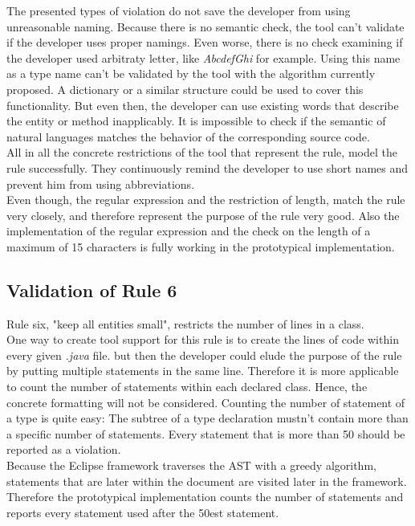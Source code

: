The presented types of violation do not save the developer from using unreasonable naming. Because there is no semantic check, the tool can't validate if the developer uses proper namings. Even worse, there is no check examining if the developer used arbitraty letter, like \textit{AbcdefGhi} for example. Using this name as a type name can't be validated by the tool with the algorithm currently proposed. A dictionary or a similar structure could be used to cover this functionality. But even then, the developer can use existing words that describe the entity or method inapplicably. It is impossible to check if the semantic of natural languages matches the behavior of the corresponding source code.
\\

All in all the concrete restrictions of the tool that represent the rule, model the rule successfully. They continuously remind the developer to use short names and prevent him from using abbreviations. 
\\

Even though, the regular expression and the restriction of length, match the rule very closely, and therefore represent the purpose of the rule very good. Also the implementation of the regular expression and the check on the length of a maximum of 15 characters is fully working in the prototypical implementation.


\subsection*{Validation of Rule 6}
Rule six, "keep all entities small", restricts the number of lines in a class.
\\

One way to create tool support for this rule is to create the lines of code within every given \textit{.java} file. but then the developer could elude the purpose of the rule by putting multiple statements in the same line. Therefore it is more applicable to count the number of statements within each declared class. Hence, the concrete formatting will not be considered. Counting the number of statement of a type is quite easy: The subtree of a type declaration mustn't contain more than a specific number of statements. Every statement that is more than 50 should be reported as a violation. 
\\

Because the Eclipse framework traverses the \ac{AST} with a greedy algorithm, statements that are later within the document are visited later in the framework. Therefore the prototypical implementation counts the number of statements and reports every statement used after the 50est statement.
\\


